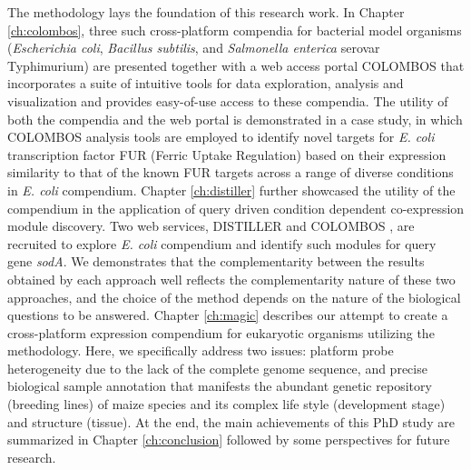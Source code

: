 %
%
The methodology lays the foundation of this research work.
%
%
%
In Chapter \ref{ch:colombos}, three such cross-platform compendia for
bacterial model organisms (\textit{Escherichia coli}, \textit{Bacillus
  subtilis}, and \textit{Salmonella enterica} serovar Typhimurium) are
presented together with a web access portal COLOMBOS that incorporates a
suite of intuitive tools for data exploration, analysis and visualization
and provides easy-of-use access to these compendia.
%
The utility of both the compendia and the web portal is demonstrated in a
case study, in which COLOMBOS analysis tools are employed to identify novel
targets for \textit{E. coli} transcription factor FUR (Ferric Uptake
Regulation) based on their expression similarity to that of the known FUR
targets across a range of diverse conditions in \textit{E. coli} compendium.
%
Chapter \ref{ch:distiller} further showcased the utility of the compendium
in the application of query driven condition dependent co-expression module
discovery.
%
Two web services, DISTILLER \cite{Lemmens2009} and COLOMBOS
\cite{Engelen2011}, are recruited to explore \textit{E. coli}
compendium and identify such modules for query gene \textit{sodA}.
%
We demonstrates that the complementarity between the results obtained by
each approach well reflects the complementarity nature of these two
approaches, and the choice of the method depends on the nature of the
biological questions to be answered.
%
%
%
Chapter \ref{ch:magic} describes our attempt to create a
cross-platform expression compendium for eukaryotic organisms utilizing the
methodology.
%
Here, we specifically address two issues: platform probe heterogeneity due
to the lack of the complete genome sequence, and precise biological sample
annotation that manifests the abundant genetic repository (breeding lines)
of maize species and its complex life style (development stage) and
structure (tissue).
%
%
%
At the end, the main achievements of this PhD study are summarized in
Chapter \ref{ch:conclusion} followed by some perspectives for future
research.










